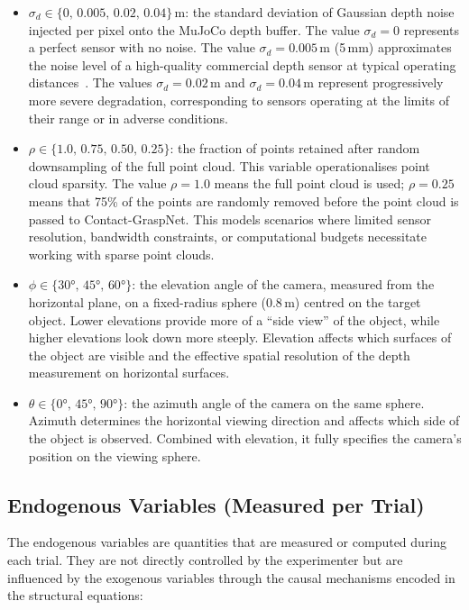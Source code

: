 \documentclass[11pt,a4paper]{report}
\begin{document}
\begin{itemize}
  \item $\sigma_d \in \{0,\, 0.005,\, 0.02,\, 0.04\}$\,m: the standard deviation of Gaussian depth noise injected per pixel onto the MuJoCo depth buffer. The value $\sigma_d = 0$ represents a perfect sensor with no noise. The value $\sigma_d = 0.005$\,m (5\,mm) approximates the noise level of a high-quality commercial depth sensor at typical operating distances~\cite{khoshelham2011accuracy}. The values $\sigma_d = 0.02$\,m and $\sigma_d = 0.04$\,m represent progressively more severe degradation, corresponding to sensors operating at the limits of their range or in adverse conditions.

  \item $\rho \in \{1.0,\, 0.75,\, 0.50,\, 0.25\}$: the fraction of points retained after random downsampling of the full point cloud. This variable operationalises point cloud sparsity. The value $\rho = 1.0$ means the full point cloud is used; $\rho = 0.25$ means that 75\% of the points are randomly removed before the point cloud is passed to Contact-GraspNet. This models scenarios where limited sensor resolution, bandwidth constraints, or computational budgets necessitate working with sparse point clouds.

  \item $\phi \in \{30°,\, 45°,\, 60°\}$: the elevation angle of the camera, measured from the horizontal plane, on a fixed-radius sphere (0.8\,m) centred on the target object. Lower elevations provide more of a ``side view'' of the object, while higher elevations look down more steeply. Elevation affects which surfaces of the object are visible and the effective spatial resolution of the depth measurement on horizontal surfaces.

  \item $\theta \in \{0°,\, 45°,\, 90°\}$: the azimuth angle of the camera on the same sphere. Azimuth determines the horizontal viewing direction and affects which side of the object is observed. Combined with elevation, it fully specifies the camera's position on the viewing sphere.
\end{itemize}

\subsection{Endogenous Variables (Measured per Trial)}

The endogenous variables are quantities that are measured or computed during each trial. They are not directly controlled by the experimenter but are influenced by the exogenous variables through the causal mechanisms encoded in the structural equations:
\end{document}
